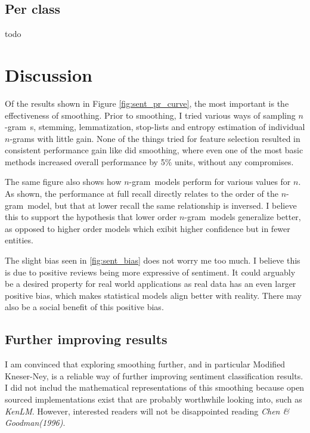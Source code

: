 \documentclass[a4paper,11pt]{kth-mag}
\newcommand{\ngram}{$n$-gram}
\newcommand{\ysc}{Modified Kneser-Ney classifier}
\begin{document}
\subsection{Per class}
todo


\newpage
\section{Discussion}
Of the results shown in Figure \ref{fig:sent_pr_curve}, the most important 
is the effectiveness of smoothing.
Prior to smoothing, I tried various ways of sampling \ngram~s, stemming, lemmatization, stop-lists and entropy estimation of individual \ngram s with little gain. None of the things tried for feature selection resulted in consistent performance gain like did smoothing, where even one of the most basic methods increased overall performance by 5\% units, without any compromises.

The same figure also shows how \ngram~models perform for various values for $n$.
As shown, the performance at full recall directly relates to the order of the
\ngram~model, but that at lower recall the same relationship is inversed. I believe this
to support the hypothesis that lower order \ngram~models generalize better, as opposed to higher order
models which exibit higher confidence but in fewer entities.



The slight bias seen in \ref{fig:sent_bias} does not worry me too much.
I believe this is due to positive reviews being more expressive of sentiment. It could arguably be a desired property for real world applications as real data has an even larger positive bias, which makes statistical models align better with reality. There may also be a social benefit of this positive bias.


\subsection{Further improving results}
I am convinced that exploring smoothing further, and in particular Modified Kneser-Ney,
is a reliable way of further improving sentiment classification results. I did not includ the
mathematical representations of this smoothing because open sourced implementations exist
that are probably worthwhile looking into, such as \emph{KenLM}\cite{kenlm}. However, interested readers will not
be disappointed reading \emph{Chen \& Goodman(1996)}\cite{chen_goodman}.
\end{document}
